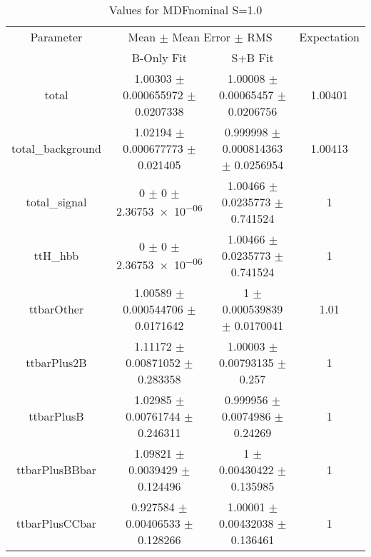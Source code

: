 \begin{table}
\centering
\caption{Values for MDFnominal S=1.0}
\begin{tabular}{cccc}
\toprule
Parameter & \multicolumn{2}{c}{Mean $\pm$ Mean Error $\pm$ RMS} & Expectation\\
 & B-Only Fit & S+B Fit & \\
\midrule
total & \num{1.00303} $\pm$ \num{0.000655972} $\pm$ \num{0.0207338} & \num{1.00008} $\pm$ \num{0.00065457} $\pm$ \num{0.0206756} & \num{1.00401}\\
total\_background & \num{1.02194} $\pm$ \num{0.000677773} $\pm$ \num{0.021405} & \num{0.999998} $\pm$ \num{0.000814363} $\pm$ \num{0.0256954} & \num{1.00413}\\
total\_signal & \num{0} $\pm$ \num{0} $\pm$ \num{2.36753e-06} & \num{1.00466} $\pm$ \num{0.0235773} $\pm$ \num{0.741524} & \num{1}\\
ttH\_hbb & \num{0} $\pm$ \num{0} $\pm$ \num{2.36753e-06} & \num{1.00466} $\pm$ \num{0.0235773} $\pm$ \num{0.741524} & \num{1}\\
ttbarOther & \num{1.00589} $\pm$ \num{0.000544706} $\pm$ \num{0.0171642} & \num{1} $\pm$ \num{0.000539839} $\pm$ \num{0.0170041} & \num{1.01}\\
ttbarPlus2B & \num{1.11172} $\pm$ \num{0.00871052} $\pm$ \num{0.283358} & \num{1.00003} $\pm$ \num{0.00793135} $\pm$ \num{0.257} & \num{1}\\
ttbarPlusB & \num{1.02985} $\pm$ \num{0.00761744} $\pm$ \num{0.246311} & \num{0.999956} $\pm$ \num{0.0074986} $\pm$ \num{0.24269} & \num{1}\\
ttbarPlusBBbar & \num{1.09821} $\pm$ \num{0.0039429} $\pm$ \num{0.124496} & \num{1} $\pm$ \num{0.00430422} $\pm$ \num{0.135985} & \num{1}\\
ttbarPlusCCbar & \num{0.927584} $\pm$ \num{0.00406533} $\pm$ \num{0.128266} & \num{1.00001} $\pm$ \num{0.00432038} $\pm$ \num{0.136461} & \num{1}\\
\bottomrule
\end{tabular}
\end{table}